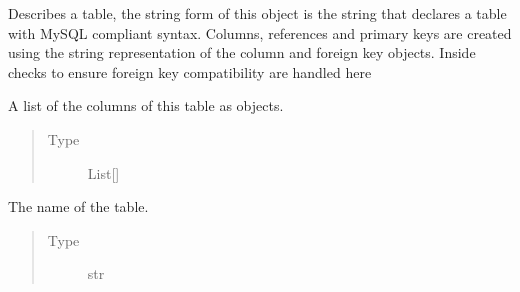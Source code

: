 \documentclass[letterpaper,10pt,english]{sphinxmanual}
\begin{document}
\begin{fulllineitems}
\label{\detokenize{model:mini_sql.model.table.Table}}
\sphinxAtStartPar
Describes a table, the string form of this object is the
string that declares a table with MySQL compliant syntax.
Columns, references and primary keys are created using the
string representation of the column and foreign key objects.
Inside checks to ensure foreign key compatibility are handled
here

\begin{fulllineitems}
\label{\detokenize{model:mini_sql.model.table.Table.__columns}}
\sphinxAtStartPar
A list of the columns of this table as objects.
\begin{quote}\begin{description}
\item[{Type}] \leavevmode
\sphinxAtStartPar
List{[}{\hyperref[\detokenize{model:mini_sql.model.column.Column}]{}}{]}

\end{description}\end{quote}

\end{fulllineitems}


\begin{fulllineitems}
\label{\detokenize{model:mini_sql.model.table.Table.__name}}
\sphinxAtStartPar
The name of the table.
\begin{quote}\begin{description}
\item[{Type}] \leavevmode
\sphinxAtStartPar
str

\end{description}\end{quote}


\end{fulllineitems}
\end{fulllineitems}
\end{document}
